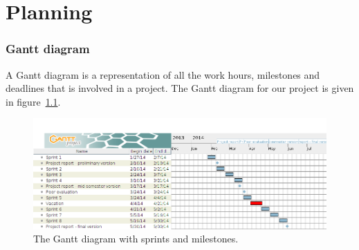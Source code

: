 \chapter{Planning}
\subsection{Gantt diagram}

A Gantt diagram is a representation of all the work hours, milestones and deadlines that is involved in a project. The Gantt diagram for our project is given in figure~\ref{fig:gantt}.

\begin{figure}[H]
\includegraphics[width=\textwidth]{ch/planning/fig/gantt.png}
\caption{The Gantt diagram with sprints and milestones.}
\label{fig:gantt}
\end{figure}



\newpage

\newpage




